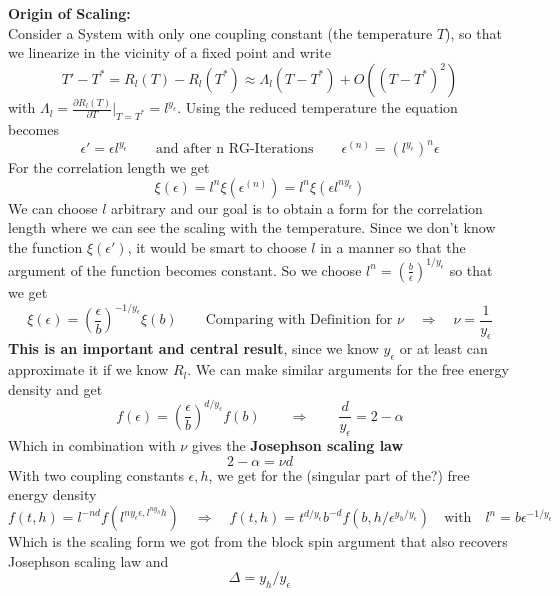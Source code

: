 	
	\textbf{Origin of Scaling:} \\
	Consider a System with only one coupling constant (the temperature $T$), so that we linearize in the vicinity of a fixed point and write
	\begin{equation}
		T' - T^* =	R_l(T) - R_l(T^*) \approx \Lambda_l(T - T^*) + O((T - T^*)^2)
	\end{equation}
	with $\Lambda_l = \frac{\partial R_l(T)}{\partial T}\big|_{T=T^*} =	l^{y_\epsilon}$. Using the reduced temperature the equation becomes
	\begin{equation}
		\epsilon' = \epsilon l^{y_\epsilon} \qquad \text{and after n RG-Iterations} \qquad \epsilon^{(n)} =	(l^{y_\epsilon})^n \epsilon
	\end{equation}
	For the correlation length we get
	\begin{equation}
		\xi(\epsilon) =	l^n \xi(\epsilon^{(n)}) =	l^n \xi(\epsilon l^{n y_\epsilon})
	\end{equation}
	We can choose $l$ arbitrary and our goal is to obtain a form for the correlation length where we can see the scaling with the temperature. Since we don't know the function $\xi(\epsilon')$, it would be smart to choose $l$ in a manner so that the argument of the function becomes constant. So we choose $l^n =	\left(\frac{b}{\epsilon}\right)^{1/y_\epsilon}$ so that we get
	\begin{equation}
		\xi(\epsilon) =	\left(\frac{\epsilon}{b}\right)^{-1/y_\epsilon} \xi(b) \qquad \text{Comparing with Definition for $\nu$} \quad \Rightarrow \quad \nu =	\frac{1}{y_\epsilon}
	\end{equation}
	\textbf{This is an important and central result}, since we know $y_\epsilon$ or at least can approximate it if we know $R_l$. We can make similar arguments for the free energy density and get
	\begin{equation}
		f(\epsilon) =	\left(\frac{\epsilon}{b}\right)^{d/y_\epsilon} f(b) \qquad \Rightarrow	 \qquad \frac{d}{y_\epsilon} =	2 - \alpha
	\end{equation}
	Which in combination with $\nu$ gives the \textbf{Josephson scaling law}
	\begin{equation}
		2 - \alpha =	\nu d
	\end{equation}
	With two coupling constants $\epsilon, h$, we get for the (singular part of the?) free energy density
	\begin{equation}
		f(t,h) =	l^{-nd} f(l^{ny_\epsilon \epsilon, l^{ny_h} h}) \quad \Rightarrow \quad f(t, h) =	t^{d/y_\epsilon} b^{-d} f(b, h / \epsilon^{y_h /	y_\epsilon}) \quad \text{with} \quad l^n =	b \epsilon^{-1/y_\epsilon}
	\end{equation}
	Which is the scaling form we got from the block spin argument that also recovers Josephson scaling law and
	\begin{equation}
		\Delta =	y_h/y_\epsilon
	\end{equation}
	
